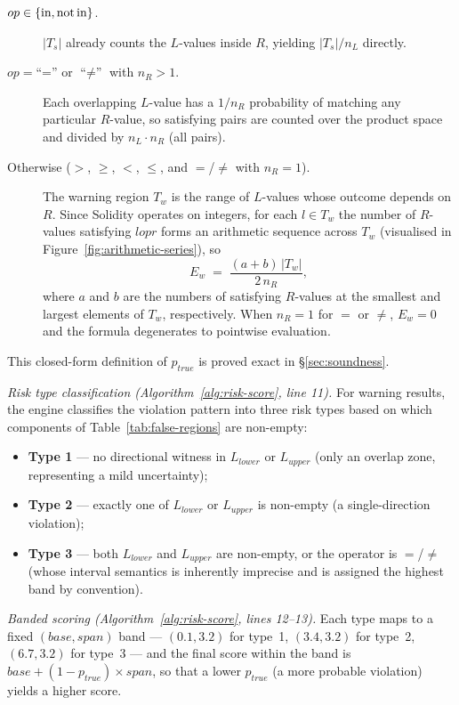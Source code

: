 \documentclass[pdflatex,sn-basic]{sn-jnl}%
\theoremstyle{thmstyleone}%
\theoremstyle{thmstyletwo}%
\theoremstyle{thmstylethree}%
\begin{document}
\begin{description}
\item[$op \in \{\text{in}, \text{not\,in}\}$.] $|T_s|$ already counts the $L$-values inside $R$, yielding $|T_s|/n_L$ directly.
\item[$op = \text{``=''}$ or $\text{``$\neq$''}$ with $n_R > 1$.] Each overlapping $L$-value has a $1/n_R$ probability of matching any particular $R$-value, so satisfying pairs are counted over the product space and divided by $n_L \cdot n_R$ (all pairs).
\item[Otherwise ($>$, $\geq$, $<$, $\leq$, and $=$/$\neq$ with $n_R = 1$).] The warning region $T_w$ is the range of $L$-values whose outcome depends on $R$.
Since Solidity operates on integers, for each $l \in T_w$ the number of $R$-values satisfying $l \mathrel{op} r$ forms an arithmetic sequence across $T_w$ (visualised in Figure~\ref{fig:arithmetic-series}), so
\[
E_w \;=\; \frac{(a + b) \, |T_w|}{2 \, n_R},
\]
where $a$ and $b$ are the numbers of satisfying $R$-values at the smallest and largest elements of $T_w$, respectively.
When $n_R = 1$ for $=$ or $\neq$, $E_w = 0$ and the formula degenerates to pointwise evaluation.
\end{description}

This closed-form definition of $p_{\mathit{true}}$ is proved exact in §\ref{sec:soundness}.

\smallskip
\noindent\textit{Risk type classification (Algorithm~\ref{alg:risk-score}, line 11).}
For warning results, the engine classifies the violation pattern into three risk types based on which components of Table~\ref{tab:false-regions} are non-empty:
\begin{itemize}
    \item \textbf{Type 1} --- no directional witness in $L_{\mathit{lower}}$ or $L_{\mathit{upper}}$ (only an overlap zone, representing a mild uncertainty);
    \item \textbf{Type 2} --- exactly one of $L_{\mathit{lower}}$ or $L_{\mathit{upper}}$ is non-empty (a single-direction violation);
    \item \textbf{Type 3} --- both $L_{\mathit{lower}}$ and $L_{\mathit{upper}}$ are non-empty, or the operator is $=$/$\neq$ (whose interval semantics is inherently imprecise and is assigned the highest band by convention).
\end{itemize}

\smallskip
\noindent\textit{Banded scoring (Algorithm~\ref{alg:risk-score}, lines 12--13).}
Each type maps to a fixed $(\mathit{base}, \mathit{span})$ band --- $(0.1, 3.2)$ for type~1, $(3.4, 3.2)$ for type~2, $(6.7, 3.2)$ for type~3 --- and the final score within the band is $\mathit{base} + (1 - p_{\mathit{true}}) \times \mathit{span}$, so that a lower $p_{\mathit{true}}$ (a more probable violation) yields a higher score.
\end{document}
